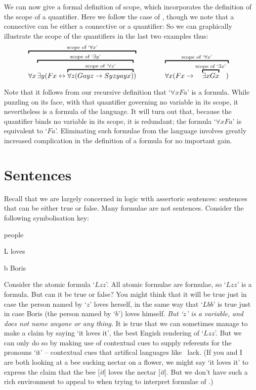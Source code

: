 We can now give a formal definition of scope, which incorporates the definition of the scope of a quantifier. Here we follow the case of \TFL, though we note that a connective can be either a connective or a quantifier:
So we can graphically illustrate the scope of the quantifiers in the last two examples thus:
	$$\overbracket{\forall x \overbracket{\exists y (Fx \eiff \overbracket{\forall z (Gayz \eif Syzyayx)}^{\text{scope of `}\forall z\text{'}}}^{\text{scope of `}\exists y\text{'}})}^{\text{scope of `}\forall x\text{'}} \qquad\qquad 
\overbracket{\forall x (Fx \to \overbracket{\exists x Gx}^{\text{scope of `$\exists x$'}})}^{\text{scope of `$\forall x$'}}	$$

Note that it follows from our recursive definition that `$\forall x Fa$' is a formula. While puzzling on its face, with that quantifier governing no variable in its scope, it nevertheless is a formula of the language. It will turn out that, because the quantifier binds no variable in its scope, it is redundant; the formula `$\forall xFa$' is equivalent to `$Fa$'. Eliminating such formulae from the language involves greatly increased complication in the definition of a formula for no important gain.

\section{Sentences}
Recall that we are largely concerned in logic with assertoric sentences: sentences that can be either true or false. Many formulae are not sentences. Consider the following symbolisation key:
	\begin{ekey}
		\item[\text{domain}] people
		\item[L\meta{xy}]  loves 
		\item[b] Boris
	\end{ekey}
Consider the atomic formula `$Lzz$'. All atomic formulae are formulae, so `$Lzz$' is a formula. But can it be true or false? You might think that it will be true just in case the person named by `$z$' loves herself, in the same way that `$Lbb$' is true just in case Boris (the person named by `$b$') loves himself. \emph{But `$z$' is a variable, and does not name anyone or any thing.} It is true that we can sometimes manage to make a claim by saying `it loves it', the best Engish rendering of `$Lzz$'. But we can only do so by making use of contextual cues to supply referents for the pronouns `it' – contextual cues that artifical languages like \FOL\ lack. (If you and I are both looking at a bee sucking nectar on a flower, we might say `it loves it' to express the claim that the bee [\emph{it}]  loves the nectar [\emph{it}]. But we don't have such a rich environment to appeal to when trying to interpret formulae of \FOL.)

